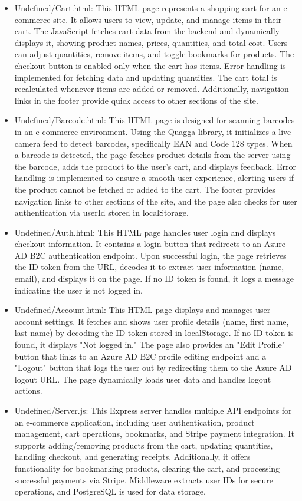 \documentclass[conference]{IEEEtran}
\begin{document}
\begin{itemize}
\item Undefined/Cart.html:	This HTML page represents a shopping cart for an e-commerce site. It allows users to view, update, and manage items in their cart. The JavaScript fetches cart data from the backend and dynamically displays it, showing product names, prices, quantities, and total cost. Users can adjust quantities, remove items, and toggle bookmarks for products. The checkout button is enabled only when the cart has items. Error handling is implemented for fetching data and updating quantities. The cart total is recalculated whenever items are added or removed. Additionally, navigation links in the footer provide quick access to other sections of the site.
\item Undefined/Barcode.html:	This HTML page is designed for scanning barcodes in an e-commerce environment. Using the Quagga library, it initializes a live camera feed to detect barcodes, specifically EAN and Code 128 types. When a barcode is detected, the page fetches product details from the server using the barcode, adds the product to the user's cart, and displays feedback. Error handling is implemented to ensure a smooth user experience, alerting users if the product cannot be fetched or added to the cart. The footer provides navigation links to other sections of the site, and the page also checks for user authentication via userId stored in localStorage.
\item Undefined/Auth.html:	This HTML page handles user login and displays checkout information. It contains a login button that redirects to an Azure AD B2C authentication endpoint. Upon successful login, the page retrieves the ID token from the URL, decodes it to extract user information (name, email), and displays it on the page. If no ID token is found, it logs a message indicating the user is not logged in.
\item Undefined/Account.html:	This HTML page displays and manages user account settings. It fetches and shows user profile details (name, first name, last name) by decoding the ID token stored in localStorage. If no ID token is found, it displays "Not logged in." The page also provides an "Edit Profile" button that links to an Azure AD B2C profile editing endpoint and a "Logout" button that logs the user out by redirecting them to the Azure AD logout URL. The page dynamically loads user data and handles logout actions.
\item Undefined/Server.js:	This Express server handles multiple API endpoints for an e-commerce application, including user authentication, product management, cart operations, bookmarks, and Stripe payment integration. It supports adding/removing products from the cart, updating quantities, handling checkout, and generating receipts. Additionally, it offers functionality for bookmarking products, clearing the cart, and processing successful payments via Stripe. Middleware extracts user IDs for secure operations, and PostgreSQL is used for data storage.

\end{itemize}
\end{document}
